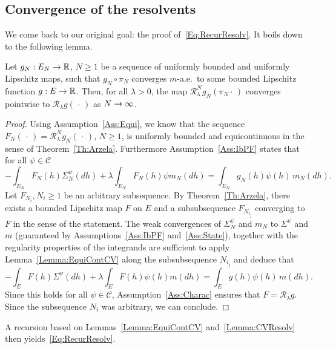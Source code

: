 \documentclass[AHL,Unicode,longabstracts]{cedram}
\theoremstyle{plain}
\newcommand{\cC}{\mathcal{C}}
\newcommand{\cR}{\mathcal{R}}
\newcommand{\R}{\mathbb{R}}
\renewcommand*{\to}{\mathchoice{\longrightarrow}{\rightarrow}{\rightarrow}{\rightarrow}}
\begin{document}
\subsection{Convergence of the resolvents}

We come back to our original goal: the proof of~\eqref{Eq:RecurResolv}. It boils down to the following lemma.

\begin{lemm}\label{Lemma:CVResolv}
Let $g_N:E_N\to\R$, $N\geq 1$ be a sequence of uniformly bounded and uniformly Lipschitz maps, such that $g_N\circ \pi_N$ converges $m$-a.e.~to some bounded Lipschitz function $g:E\to\R$. Then, for all $\lambda > 0$, the map $\cR_\lambda^N g_N(\pi_N\cdot\,)$ converges pointwise to $\cR_\lambda g(\,\cdot\,)$ as $N\to\infty$.
\end{lemm}
\begin{proof}
Using Assumption~\ref{Ass:Equi}, we know that the sequence $F_N(\,\cdot\,)=\cR_\lambda^N g_N(\,\cdot\,)$, $N\geq 1$, is uniformly bounded and equicontinuous in the sense of Theorem~\ref{Th:Arzela}. Furthermore Assumption~\ref{Ass:IbPF} states that for all $\psi \in \cC$
\begin{equation*}
-\int_{E_N} F_N(h) \Sigma_N^{\psi}(dh) + \lambda \int_{E_N} F_N(h) \psi m_N(dh) = \int_{E_N} g_N(h) \psi(h)\, m_N(dh).
\end{equation*}
Let $F_{N_i}, N_i\geq 1$ be an arbitrary subsequence. By Theorem~\ref{Th:Arzela}, there exists a bounded Lipschitz map $F$ on $E$ and a subsubsequence $F_{N_{i_j}}$ converging to $F$ in the sense of the statement. The weak convergences of $\Sigma_N^\psi$ and $m_N$ to $\Sigma^\psi$ and $m$ (guaranteed by Assumptions~\ref{Ass:IbPF} and~\ref{Ass:State}), together with the regularity properties of the integrands are sufficient to apply Lemma~\ref{Lemma:EquiContCV} along the subsubsequence $N_{i_j}$ and deduce that
\begin{equation*}
-\int_{E} F(h) \Sigma^{\psi}(dh) + \lambda \int_{E} F(h) \psi(h) m(dh) = \int_{E} g(h) \psi(h)\, m(dh).
\end{equation*}
Since this holds for all $\psi \in \cC$, Assumption~\ref{Ass:Charac} ensures that $F=\cR_\lambda g$. Since the subsequence $N_i$ was arbitrary, we can conclude.
\end{proof}

A recursion based on Lemmas~\ref{Lemma:EquiContCV} and~\ref{Lemma:CVResolv} then yields~\eqref{Eq:RecurResolv}.
\end{document}

